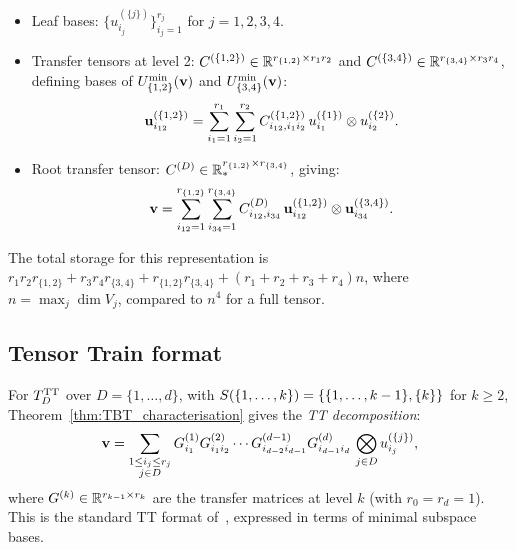 \begin{itemize}
\item Leaf bases: $\{u^{(\{j\})}_{i_j}\}_{i_j=1}^{r_j}$ for $j=1,2,3,4$.
\item Transfer tensors at level 2:
    $C^{(\{1,2\})} \in \mathbb{R}^{r_{\{1,2\}} \times r_1 r_2}$ and
    $C^{(\{3,4\})} \in \mathbb{R}^{r_{\{3,4\}} \times r_3 r_4}$, defining
    bases of $U^{\min}_{\{1,2\}}(\mathbf{v})$ and $U^{\min}_{\{3,4\}}(\mathbf{v})$:
    \begin{equation*}
        \mathbf{u}^{(\{1,2\})}_{i_{12}}
        = \sum_{i_1=1}^{r_1}\sum_{i_2=1}^{r_2}
        C^{(\{1,2\})}_{i_{12},i_1 i_2}\, u^{(\{1\})}_{i_1} \otimes u^{(\{2\})}_{i_2}.
    \end{equation*}
\item Root transfer tensor:
    $C^{(D)} \in \mathbb{R}^{r_{\{1,2\}} \times r_{\{3,4\}}}_*$, giving:
    \begin{equation*}
        \mathbf{v} = \sum_{i_{12}=1}^{r_{\{1,2\}}} \sum_{i_{34}=1}^{r_{\{3,4\}}}
        C^{(D)}_{i_{12},i_{34}}\,
        \mathbf{u}^{(\{1,2\})}_{i_{12}} \otimes \mathbf{u}^{(\{3,4\})}_{i_{34}}.
    \end{equation*}
\end{itemize}

The total storage for this representation is
$r_1 r_2 r_{\{1,2\}} + r_3 r_4 r_{\{3,4\}} + r_{\{1,2\}} r_{\{3,4\}}
+ (r_1 + r_2 + r_3 + r_4) n$,
where $n = \max_j \dim V_j$, compared to $n^4$ for a full tensor.

\subsection*{Tensor Train format}

For $T_D^{\mathrm{TT}}$ over $D = \{1,\ldots,d\}$, with
$S(\{1,\ldots,k\}) = \{\{1,\ldots,k-1\},\{k\}\}$ for $k \geq 2$,
Theorem~\ref{thm:TBT_characterisation} gives the
\emph{TT decomposition}:
\begin{equation}
\label{eq:TT_decomposition}
    \mathbf{v} = \sum_{\substack{1 \leq i_j \leq r_j \\ j \in D}}
    G^{(1)}_{i_1} G^{(2)}_{i_1 i_2} \cdots G^{(d-1)}_{i_{d-2}i_{d-1}}
    G^{(d)}_{i_{d-1} i_d}\,
    \bigotimes_{j \in D} u^{(\{j\})}_{i_j},
\end{equation}
where $G^{(k)} \in \mathbb{R}^{r_{k-1} \times r_k}$ are the transfer matrices
at level $k$ (with $r_0 = r_d = 1$). This is the standard TT format
of~\cite{Oseledets2011}, expressed in terms of minimal subspace bases.

